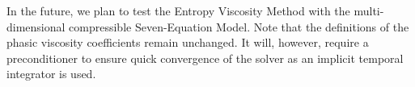 \documentclass[preprint,10pt]{elsarticle}
\begin{document}
In the future, we plan to test the Entropy Viscosity Method with the multi-dimensional compressible Seven-Equation Model. Note that the definitions of the phasic viscosity coefficients remain unchanged. It will, however, require a preconditioner to ensure quick convergence of the solver as an implicit temporal integrator is used. 


%

\end{document}
